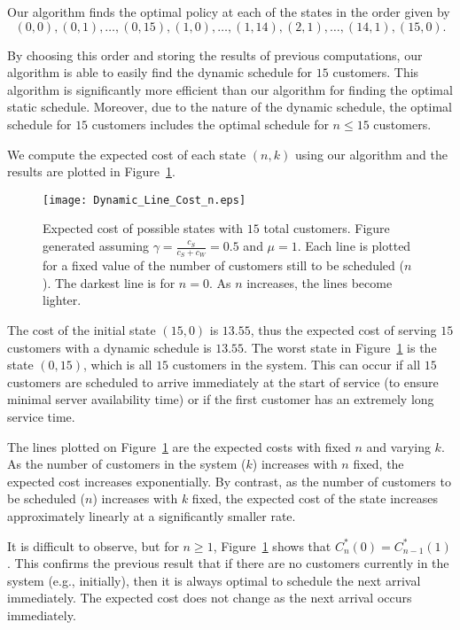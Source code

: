 Our algorithm finds the optimal policy at each of the states in the order given by
\begin{equation}
	(0, 0), (0, 1), \ldots, (0, 15), (1, 0), \ldots, (1, 14), (2, 1), \ldots, (14, 1), (15, 0).
\end{equation}

By choosing this order and storing the results of previous computations, our algorithm is able to easily find the dynamic schedule for $15$ customers. This algorithm is significantly more efficient than our algorithm for finding the optimal static schedule. Moreover, due to the nature of the dynamic schedule, the optimal schedule for $15$ customers includes the optimal schedule for $n \leq 15$ customers.

We compute the expected cost of each state $(n, k)$ using our algorithm and the results are plotted in Figure~\ref{fig:Dynamic_Cost_15}.
\begin{figure}[htb]
	\centering
	\texttt{[image: Dynamic\_Line\_Cost\_n.eps]}
	\caption{Expected cost of possible states with $15$ total customers. Figure generated assuming $\gamma = \frac{c_{S}}{c_{S} + c_{W}} = 0.5$ and $\mu = 1$. Each line is plotted for a fixed value of the number of customers still to be scheduled ($n$). The darkest line is for $n = 0$. As $n$ increases, the lines become lighter.}
	\label{fig:Dynamic_Cost_15}
\end{figure}

The cost of the initial state $(15, 0)$ is $13.55$, thus the expected cost of serving $15$ customers with a dynamic schedule is $13.55$. The worst state in Figure~\ref{fig:Dynamic_Cost_15} is the state $(0, 15)$, which is all $15$ customers in the system. This can occur if all $15$ customers are scheduled to arrive immediately at the start of service (to ensure minimal server availability time) or if the first customer has an extremely long service time.

The lines plotted on Figure~\ref{fig:Dynamic_Cost_15} are the expected costs with fixed $n$ and varying $k$. As the number of customers in the system ($k$) increases with $n$ fixed, the expected cost increases exponentially. By contrast, as the number of customers to be scheduled ($n$) increases with $k$ fixed, the expected cost of the state increases approximately linearly at a significantly smaller rate.

It is difficult to observe, but for $n \geq 1$, Figure~\ref{fig:Dynamic_Cost_15} shows that $C_{n}^{*} (0) = C_{n - 1}^{*} (1)$. This confirms the previous result that if there are no customers currently in the system (e.g., initially), then it is always optimal to schedule the next arrival immediately. The expected cost does not change as the next arrival occurs immediately.

